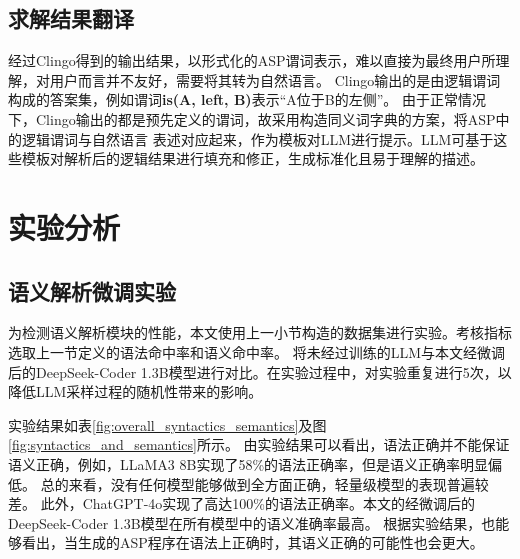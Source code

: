 \subsection{求解结果翻译}
经过Clingo得到的输出结果，以形式化的ASP谓词表示，难以直接为最终用户所理解，对用户而言并不友好，需要将其转为自然语言。
Clingo输出的是由逻辑谓词构成的答案集，例如谓词\textbf{is(A, left, B)}表示“A位于B的左侧”。
由于正常情况下，Clingo输出的都是预先定义的谓词，故采用构造同义词字典的方案，将ASP中的逻辑谓词与自然语言
表述对应起来，作为模板对LLM进行提示。LLM可基于这些模板对解析后的逻辑结果进行填充和修正，生成标准化且易于理解的描述。
\section{实验分析}
\subsection{语义解析微调实验}
为检测语义解析模块的性能，本文使用上一小节构造的数据集进行实验。考核指标选取上一节定义的语法命中率和语义命中率。
将未经过训练的LLM与本文经微调后的DeepSeek-Coder 1.3B模型进行对比。在实验过程中，对实验重复进行5次，以
降低LLM采样过程的随机性带来的影响。

实验结果如表\ref{fig:overall_syntactics_semantics}及图\ref{fig:syntactics_and_semantics}所示。
由实验结果可以看出，语法正确并不能保证语义正确，例如，LLaMA3 8B实现了58\%的语法正确率，但是语义正确率明显偏低。
总的来看，没有任何模型能够做到全方面正确，轻量级模型的表现普遍较差。
此外，ChatGPT-4o实现了高达100\%的语法正确率。本文的经微调后的DeepSeek-Coder 1.3B模型在所有模型中的语义准确率最高。
根据实验结果，也能够看出，当生成的ASP程序在语法上正确时，其语义正确的可能性也会更大。


